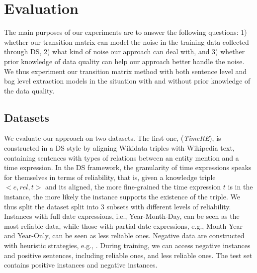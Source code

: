 \section{Evaluation \label{sec:evaluation}}
The main purposes of our experiments are to answer the following questions: 1) whether our transition matrix can model the noise in the training data collected through DS, 2) what kind of noise our approach can deal with, and 3) whether prior knowledge of data quality can help our approach better handle the noise.
We thus experiment our transition matrix method with both sentence level and bag level extraction models in the situation with and without prior knowledge of the data quality.
\subsection{Datasets}
We evaluate our approach on two datasets.
The first one, (\emph{TimeRE}), is %
constructed in a DS style by aligning Wikidata triples with Wikipedia text,  containing  sentences with  types of relations  between an entity mention and a time expression.  In the DS framework,   the granularity of time expressions speaks for themselves in terms of reliability, that is, given a knowledge triple $<e, rel, t>$ and its aligned,  the more fine-grained the time expression $t$ is in the instance, the more likely the instance  supports the existence of the triple.    We thus split the dataset  split into 3 subsets with different levels of reliability. Instances with full date expressions, i.e.,  Year-Month-Day, can be seen as the most reliable data, while those with partial date expressions, e.g., Month-Year and Year-Only, can be seen as less reliable ones.  Negative data are constructed with heuristic strategies, e.g.,  .
During training, we can access   negative instances and   positive sentences, including  reliable ones,  and  less reliable ones. The test set contains  positive instances and  negative instances.

